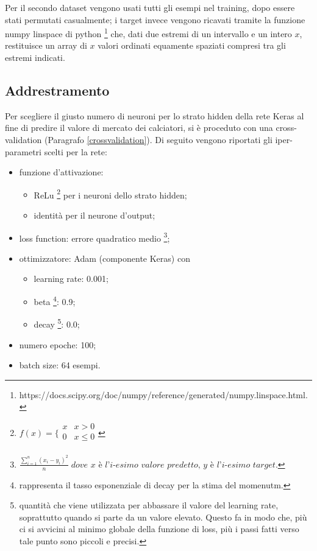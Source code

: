 \documentclass[12pt]{report}
\begin{document}
Per il secondo dataset vengono usati tutti gli esempi nel training, dopo essere stati permutati casualmente; i target invece vengono ricavati tramite la funzione numpy linspace di python \footnote{https://docs.scipy.org/doc/numpy/reference/generated/numpy.linspace.html.} che, dati due estremi di un intervallo e un intero $x$, restituisce un array di $x$ valori ordinati equamente spaziati compresi tra gli estremi indicati.

\subsection{Addrestramento}\label{relu}
Per scegliere il giusto numero di neuroni per lo strato hidden della rete Keras al fine di predire il valore di mercato dei calciatori, si è proceduto con una cross-validation (Paragrafo \ref{crossvalidation}). Di seguito vengono riportati gli iper-parametri scelti per la rete:
\begin{itemize}
\item{funzione d’attivazione}:

\begin{itemize}
\item{ReLu 
\footnote{$f(x) =
\bigg \{
\begin{array}{rl}
x & x > 0 \\
0 & x \leq 0 \\
\end{array}
$
} per i neuroni dello strato hidden};
\item{identità per il neurone d'output};
\end{itemize}

\item{loss function}: errore quadratico medio \footnote{
$\displaystyle{\frac{\sum_{i=1}^n \left(x_i - y_i\right)^2}{n}} \; \textit{dove x è l'i-esimo valore predetto, y è l'i-esimo target}$.
};

\item{ottimizzatore}: Adam (componente Keras) con

\begin{itemize}
\item{learning rate}: 0.001;
\item{beta \footnote{rappresenta il tasso esponenziale di decay per la stima del momenutm.}}: 0.9;
\item{decay \footnote{quantità che viene utilizzata per abbassare il valore del learning rate, soprattutto quando si parte da un valore elevato. Questo fa in modo che, più ci si avvicini al minimo globale della funzione di loss, più i passi fatti verso tale punto sono piccoli e precisi.}}: 0.0;
\end{itemize}

\item{numero epoche}: 100;

\item{batch size}: 64 esempi.
\end{itemize}
\end{document}
